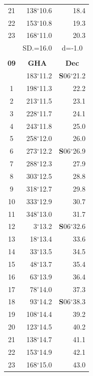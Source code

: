 \documentclass[10pt, a4paper]{report}
\begin{document}
\begin{scriptsize}
\begin{tabular*}{0.2\textwidth}[t]{@{\extracolsep{\fill}}|c|rr|}
21 & 138$^\circ$10.6 & \raisebox{0.24ex}{\boldmath$\cdot$~\boldmath$\cdot$~~}18.4\\
22 & 153$^\circ$10.8 & 19.3\\
23 & 168$^\circ$11.0 & 20.3\\
\hline
\rule{0pt}{2.4ex} & \multicolumn{1}{c}{SD.=16.0} & \multicolumn{1}{c|}{d=-1.0}\\
\hline
\multicolumn{1}{c}{}\\[-0.5ex]\hline
\multicolumn{1}{|c|}{\rule{0pt}{2.6ex}\textbf{09}} & \multicolumn{1}{c}{\textbf{GHA}} & \multicolumn{1}{c|}{\textbf{Dec}}\\
\hline\rule{0pt}{2.6ex}\noindent
0 & 183$^\circ$11.2 & \textbf{S}06$^\circ$21.2\\
1 & 198$^\circ$11.3 & 22.2\\
2 & 213$^\circ$11.5 & 23.1\\
3 & 228$^\circ$11.7 & \raisebox{0.24ex}{\boldmath$\cdot$~\boldmath$\cdot$~~}24.1\\
4 & 243$^\circ$11.8 & 25.0\\
5 & 258$^\circ$12.0 & 26.0\\[2Pt]
6 & 273$^\circ$12.2 & \textbf{S}06$^\circ$26.9\\
7 & 288$^\circ$12.3 & 27.9\\
8 & 303$^\circ$12.5 & 28.8\\
9 & 318$^\circ$12.7 & \raisebox{0.24ex}{\boldmath$\cdot$~\boldmath$\cdot$~~}29.8\\
10 & 333$^\circ$12.9 & 30.7\\
11 & 348$^\circ$13.0 & 31.7\\[2Pt]
12 & 3$^\circ$13.2 & \textbf{S}06$^\circ$32.6\\
13 & 18$^\circ$13.4 & 33.6\\
14 & 33$^\circ$13.5 & 34.5\\
15 & 48$^\circ$13.7 & \raisebox{0.24ex}{\boldmath$\cdot$~\boldmath$\cdot$~~}35.4\\
16 & 63$^\circ$13.9 & 36.4\\
17 & 78$^\circ$14.0 & 37.3\\[2Pt]
18 & 93$^\circ$14.2 & \textbf{S}06$^\circ$38.3\\
19 & 108$^\circ$14.4 & 39.2\\
20 & 123$^\circ$14.5 & 40.2\\
21 & 138$^\circ$14.7 & \raisebox{0.24ex}{\boldmath$\cdot$~\boldmath$\cdot$~~}41.1\\
22 & 153$^\circ$14.9 & 42.1\\
23 & 168$^\circ$15.0 & 43.0\\

\end{tabular*}
\end{scriptsize}
\end{document}
